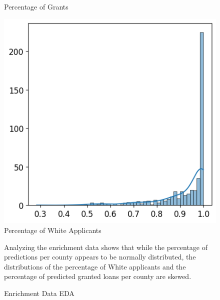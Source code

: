 \begin{figure}[h]
\begin{minipage}{0.33\textwidth}
        \small
        Percentage of Grants
    \end{minipage}\hfill
    \begin{minipage}{0.33\textwidth}
        \centering
        \includegraphics[width=\textwidth]{images/geo_enrich/white_per_county.png}
        \small
        Percentage of White Applicants
    \end{minipage}\hfill
    \caption{Enrichment Data EDA}
    \label{fig:Enrichment_Data_EDA}
    \medskip
    \small
    Analyzing the enrichment data shows that while the percentage of predictions per county appears to be normally distributed, the distributions of the percentage of White applicants and the percentage of predicted granted loans per county are skewed.
\end{figure}

%
